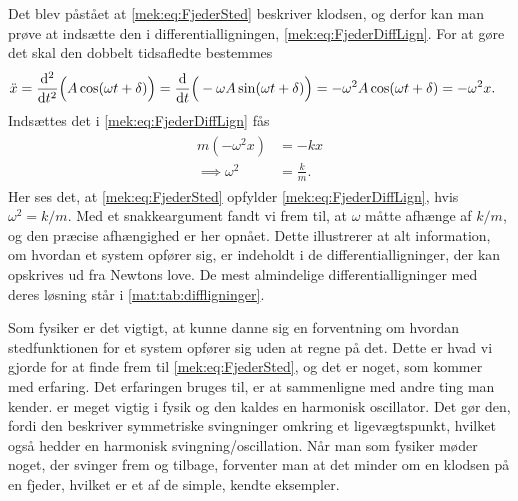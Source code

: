 \begin{example}
Det blev påstået at \cref{mek:eq:FjederSted} beskriver klodsen, og derfor kan man prøve at indsætte den i differentialligningen, \cref{mek:eq:FjederDiffLign}. For at gøre det skal den dobbelt tidsafledte bestemmes
%
\begin{align}
\begin{aligned}
	\ddot{x} &=\dv[2]{}{t} \Big( A\cos(\omega t +\delta) \Big) = \dv{}{t} \Big( -\omega A \sin(\omega t + \delta) \Big) = -\omega ^2 A \cos(\omega t + \delta ) = -\omega^2x.
\end{aligned}
\end{align}
%
Indsættes det i \cref{mek:eq:FjederDiffLign} fås
%
\begin{align}
\begin{aligned}
	m(-\omega^2x) &= -kx \\
	\implies \omega^2 &= \frac{k}{m}.
\end{aligned}
\end{align}
%
Her ses det, at \cref{mek:eq:FjederSted} opfylder \cref{mek:eq:FjederDiffLign}, hvis $\omega^2 = k/m$. Med et snakkeargument fandt vi frem til, at $\omega$ måtte afhænge af $k/m$, og den præcise afhængighed er her opnået. Dette illustrerer at alt information, om hvordan et system opfører sig, er indeholdt i de differentialligninger, der kan opskrives ud fra Newtons love. De mest almindelige differentialligninger med deres løsning står i \cref{mat:tab:diffligninger}.
\end{example}

\label{mek:page:ho_approx}
Som fysiker er det vigtigt, at kunne danne sig en forventning om hvordan stedfunktionen for et system opfører sig uden at regne på det. Dette er hvad vi gjorde for at finde frem til \cref{mek:eq:FjederSted}, og det er noget, som kommer med erfaring. Det erfaringen bruges til, er at sammenligne med andre ting man kender.  er meget vigtig i fysik og den kaldes en harmonisk oscillator. Det gør den, fordi den beskriver symmetriske svingninger omkring et ligevægtspunkt, hvilket også hedder en harmonisk svingning/oscillation. Når man som fysiker møder noget, der svinger frem og tilbage, forventer man at det minder om en klodsen på en fjeder, hvilket er et af de simple, kendte eksempler.

